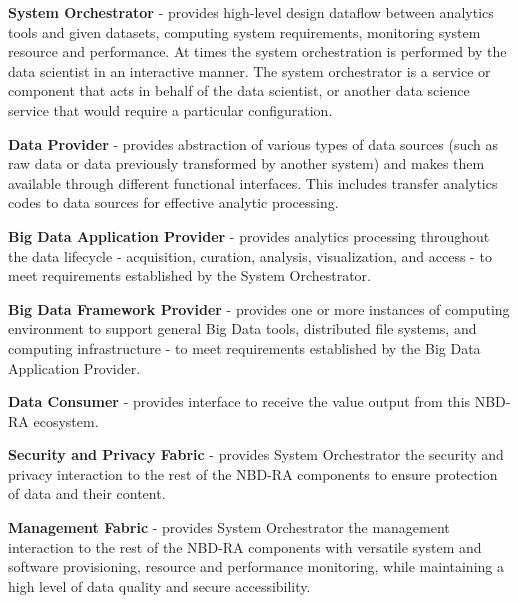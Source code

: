\begin{description}

\item {\bf System Orchestrator} - provides high-level design dataflow
  between analytics tools and given datasets, computing system
  requirements, monitoring system resource and performance. At times
  the system orchestration is performed by the data scientist in an
  interactive manner. The system orchestrator is a service or
  component that acts in behalf of the data scientist, or another data
  science service that would require a particular configuration.

\item {\bf Data Provider} - provides abstraction of various types of 
data sources (such as raw data or data previously transformed by another system) 
and makes them available through different functional interfaces. This includes 
transfer analytics codes to data sources for effective analytic processing.


\item {\bf Big Data Application Provider} - provides analytics processing 
throughout the data lifecycle - acquisition, curation, analysis, visualization, 
and access - to meet requirements established by the System Orchestrator.


\item {\bf Big Data Framework Provider} - provides one or more instances 
of computing environment to support general Big Data tools, distributed file systems, 
and computing infrastructure - to meet requirements established by the Big Data 
Application Provider.


\item  {\bf Data Consumer} - provides interface to receive the value output 
from this NBD-RA ecosystem.


\item  {\bf Security and Privacy Fabric} - provides System Orchestrator 
the security and privacy interaction to the rest of the NBD-RA components to ensure 
protection of data and their content.


\item {\bf Management Fabric} - provides System Orchestrator the management 
interaction to the rest of the NBD-RA components with versatile system and software 
provisioning, resource and performance monitoring, while maintaining a high level 
of data quality and secure accessibility.

\end{description}




